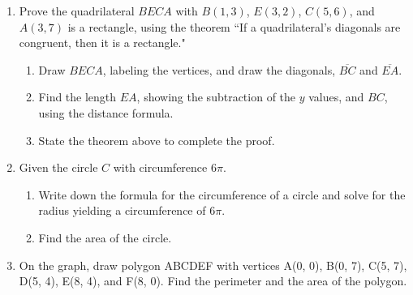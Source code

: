 \begin{enumerate}
\item Prove the quadrilateral $BECA$ with $B(1, 3)$, $E(3, 2)$, $C(5,6)$, and $A(3, 7)$ is a rectangle, using the theorem ``If a quadrilateral's diagonals are congruent, then it is a rectangle."
\begin{enumerate}
\item Draw $BECA$, labeling the vertices, and draw the diagonals, $\overline{BC}$ and $\overline{EA}$.
\item Find the length $EA$, showing the subtraction of the $y$ values, and $BC$, using the distance formula.
\item State the theorem above to complete the proof.
\end{enumerate}
\vspace{2cm}

\item Given the circle $C$ with circumference $6\pi$.
\begin{enumerate}
\item Write down the formula for the circumference of a circle and solve for the radius yielding a circumference of $6\pi$. \vspace{1cm}
\item Find the area of the circle.
\end{enumerate}

\newpage
\item On the graph, draw polygon ABCDEF with vertices A(0, 0), B(0, 7), C(5, 7), D(5, 4), E(8, 4), and F(8, 0). Find the perimeter and the area of the polygon.\\[1cm]
\vspace{2cm}


\end{enumerate}
